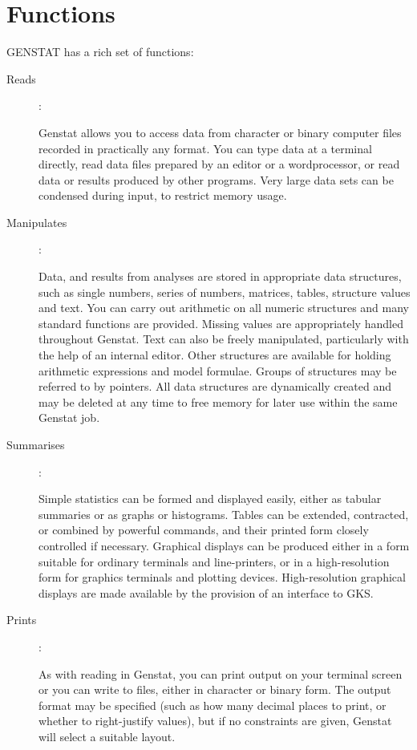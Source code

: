\section{Functions}

GENSTAT has a rich set of functions:
\begin{description}
\item [Reads]:

Genstat allows you to access data from character or binary computer files
recorded in practically any format.
You can type data at a terminal directly, read data files prepared by an
editor or a wordprocessor, or read data or results produced by other programs.
Very large data sets can be condensed during input, to restrict memory usage.

\item [Manipulates]:

Data, and results from analyses are stored in appropriate data structures,
such as single numbers, series of numbers, matrices, tables, structure values
and text.
You can carry out arithmetic on all numeric structures and many standard
functions are provided.
Missing values are appropriately handled throughout Genstat.
Text can also be freely manipulated, particularly with the help of an internal
editor.
Other structures are available for holding arithmetic expressions and model
formulae.
Groups of structures may be referred to by pointers.
All data structures are dynamically created and may be deleted at any time
to free memory for later use within the same Genstat job.

\item [Summarises]:

Simple statistics can be formed and displayed easily, either as tabular
summaries or as graphs or histograms.
Tables can be extended, contracted, or combined by powerful commands, and
their printed form closely controlled if necessary.
Graphical displays can be produced either in a form suitable for ordinary
terminals and line-printers, or in a high-resolution form for graphics
terminals and plotting devices.
High-resolution graphical displays are made available by the provision of an
interface to GKS.

\item [Prints]:

As with reading in Genstat, you can print output on your terminal screen or you
can write to files, either in character or binary form.
The output format may be specified (such as how many decimal places to print,
or whether to right-justify values),  but if no constraints are given,
Genstat will select a suitable layout.


\end{description}
